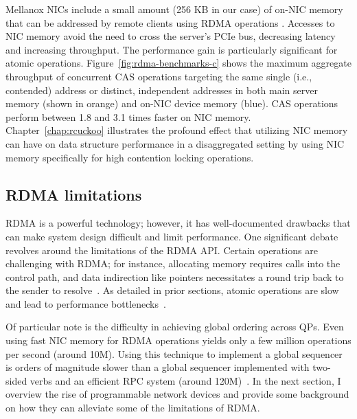 \documentclass[12pt]{ucsddissertation}
\begin{document}
Mellanox NICs include a small amount (256 KB in our case) of on-NIC memory that can be addressed by
remote clients using RDMA operations \cite{device-memory}. Accesses to NIC memory avoid the need to
cross the server's PCIe bus, decreasing latency and increasing throughput. The performance gain is
particularly significant for atomic operations. Figure~\ref{fig:rdma-benchmarks-c} shows the maximum aggregate
throughput of concurrent CAS operations targeting the same single (i.e., contended) address or
distinct, independent addresses in both main server memory (shown in orange) and on-NIC device
memory (blue). CAS operations perform between 1.8 and 3.1 times faster on NIC memory.
Chapter~\ref{chap:rcuckoo} illustrates the profound effect that utilizing NIC memory can have on data
structure performance in a disaggregated setting by using NIC memory specifically for high
contention locking operations.

\subsection{RDMA limitations}

RDMA is a powerful technology; however, it has well-documented drawbacks that can make system design
difficult and limit performance. One significant debate revolves around the limitations of the RDMA
API. Certain operations are challenging with RDMA; for instance, allocating memory requires calls
into the control path, and data indirection like pointers necessitates a round trip back to the
sender to resolve~\cite{prism}. As detailed in prior sections, atomic operations are slow and lead
to performance bottlenecks~\cite{design-guidelines}.

Of particular note is the difficulty in achieving global ordering across QPs. Even using fast NIC
memory for RDMA operations yields only a few million operations per second (around 10M). Using this
technique to implement a global sequencer is orders of magnitude slower than a global sequencer
implemented with two-sided verbs and an efficient RPC system (around 120M)~\cite{design-guidelines}.
In the next section, I overview the rise of programmable network devices and provide some background
on how they can alleviate some of the limitations of RDMA.


\end{document}
